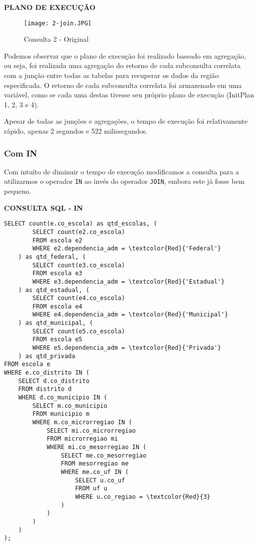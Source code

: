 \documentclass[12pt,a4paper]{article}
\begin{document}
\begin{flushleft}
\textbf{PLANO DE EXECUÇÃO}\\
\end{flushleft}

\begin{figure}[H]
    \centering
    \texttt{[image: 2-join.JPG]}
    \caption{Consulta 2 - Original}
    \label{fig:diagrama}
\end{figure}

Podemos observar que o plano de execução foi realizado baseado em agregação, ou seja, foi realizada uma agregação do retorno de cada subconsulta correlata com a junção entre todas as tabelas para recuperar os dados da região especificada. O retorno de cada subconsulta correlata foi armazenado em uma variável, como se cada uma destas tivesse seu próprio plano de execução (InitPlan 1, 2, 3 e 4).

Apesar de todas as junções e agregações, o tempo de execução foi relativamente rápido, apenas 2 segundos e 522 milissegundos.

\subsubsection{Com IN}

Com intuíto de diminuir o tempo de execução modificamos a consulta para a utilizarmos o operador \texttt{IN} ao invés do operador \texttt{JOIN}, embora este já fosse bem pequeno.

\vspace{0.5cm}

\begin{flushleft}
\textbf{CONSULTA SQL - IN}\\
\end{flushleft}

\begin{Verbatim}[commandchars=\\\{\}]
SELECT count(e.co_escola) as qtd_escolas, (
        SELECT count(e2.co_escola)
        FROM escola e2
        WHERE e2.dependencia_adm = \textcolor{Red}{'Federal'}
    ) as qtd_federal, (
        SELECT count(e3.co_escola)
        FROM escola e3
        WHERE e3.dependencia_adm = \textcolor{Red}{'Estadual'}
    ) as qtd_estadual, (
        SELECT count(e4.co_escola)
        FROM escola e4
        WHERE e4.dependencia_adm = \textcolor{Red}{'Municipal'}
    ) as qtd_municipal, (
        SELECT count(e5.co_escola)
        FROM escola e5
        WHERE e5.dependencia_adm = \textcolor{Red}{'Privada'}
    ) as qtd_privada
FROM escola e
WHERE e.co_distrito IN (
    SELECT d.co_distrito
    FROM distrito d
    WHERE d.co_municipio IN (
        SELECT m.co_municipio
        FROM municipio m
        WHERE m.co_microrregiao IN (
            SELECT mi.co_microrregiao
            FROM microrregiao mi
            WHERE mi.co_mesorregiao IN (
                SELECT me.co_mesorregiao
                FROM mesorregiao me
                WHERE me.co_uf IN (
                    SELECT u.co_uf
                    FROM uf u
                    WHERE u.co_regiao = \textcolor{Red}{3}
                )
            )
        )
    )
);
\end{Verbatim}
\end{document}

